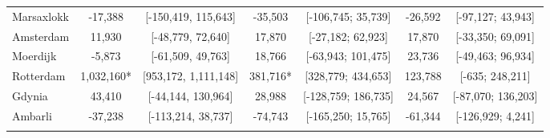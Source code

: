 \begin{table}[ht]
\begin{adjustbox}{max width=\textwidth}
\begin{tabular}{lcccccc}
  Marsaxlokk &   -17,388 & [-150,419, 115,643] &  -35,503 & [-106,745; 35,739] & -26,592 & [-97,127; 43,943] \\ 
  Amsterdam &    11,930 & [-48,779, 72,640] &   17,870 & [-27,182; 62,923] &  17,870 & [-33,350; 69,091] \\ 
  Moerdijk &    -5,873 & [-61,509, 49,763] &   18,766 & [-63,943; 101,475] &  23,736 & [-49,463; 96,934] \\ 
  Rotterdam & 1,032,160* & [953,172, 1,111,148] &  381,716* & [328,779; 434,653] & 123,788 & [-635; 248,211] \\ 
  Gdynia &    43,410 & [-44,144, 130,964] &   28,988 & [-128,759; 186,735] &  24,567 & [-87,070; 136,203] \\ 
  Ambarli &   -37,238 & [-113,214, 38,737] &  -74,743 & [-165,250; 15,765] & -61,344 & [-126,929; 4,241] \\ 
   [2ex] \hline \hline {}\end{tabular} 
 \end{adjustbox}
\endgroup
\end{table}
